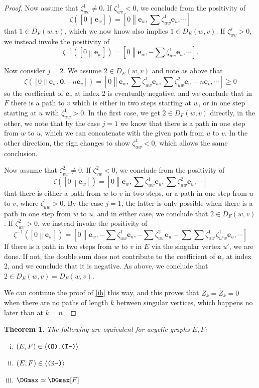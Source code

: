 \documentclass[12pt]{amsbook}%
\newcommand{\ee}{{\mathbf e}}
\newtheorem{theor}{Theorem}[section]
\theoremstyle{defin}
\theoremstyle{remark}
\numberwithin{equation}{chapter}
\numberwithin{theor}{section}
\newcommand{\IIIm}{\mbox{\texttt{\textup{(I-)}}}}
\newcommand{\OOO}{\mbox{\texttt{\textup{(O)}}}}
\newcommand{\KKKm}{\mbox{\texttt{\textup{(K-)}}}}
\newcommand{\oXe}[2]{\left[#1\left\|{#2}\right.\right]}
\newcommand{\singX}{{\circ}}
\newcommand{\oo}{{\mathbf 0}}
\newcommand{\nos}{{n_\singX}}
\begin{document}
\begin{proof}
Now assume that $\zeta^1_{wv}\not=0$. If $\zeta^1_{wv}<0$, we conclude from the positivity of
\[
\zeta( \oXe{0}{\ee_w})=\oXe{0}{\textstyle \ee_w,\sum\zeta^1_{uw}\ee_u,\cdots}
\]
that $1\in D_F(w,v)$, which we now know also implies  $1\in D_E(w,v)$. If $\zeta^j_{wv}>0$, we instead invoke the positivity of 
\[
\zeta^{-1}( \oXe{0}{\ee_w})=\oXe{0}{\ee_w,-\sum\zeta^1_{uw}\ee_u,\cdots}.
\]

Now consider $j=2$. We assume $2\in D_E(w,v)$ and note as above that 
\[
\zeta( \oXe{0}{\ee_w,\oo,-n\ee_v})=\oXe{0}{\textstyle \ee_w,\sum\zeta^1_{uw}\ee_u,\sum\zeta^2_{uw}\ee_u-n\ee_v,\cdots}\geq 0
\]
so the coefficient of $\ee_v$ at index 2 is eventually negative, and we conclude that in $F$ there is a path to $v$ which is either in two steps starting at $w$, or in one step starting at $u$ with $\zeta^1_{uw}>0$. In the first case, we get  $2\in D_F(w,v)$ directly, in the other, we note that by the case $j=1$ we know that there is a path in one step from $w$ to $u$, which we can concatenate with the given path from $u$ to $v$. In the other direction, the sign changes to show $\zeta^1_{uw}<0$, which allows the same conclusion.


Now assume that $\zeta^2_{vw}\not=0$. If $\zeta^2_{vw}<0$, we conclude from the positivity of
\[
\zeta( \oXe{0}{\ee_w})=\oXe{0}{\textstyle \ee_w,\sum\zeta^1_{uw}\ee_u,\sum\zeta^2_{uw}\ee_u,\cdots}
\]
that there is either a path from $w$ to $v$ in two steps, or a path in one step from $u$ to $v$, where $\zeta^1_{uw}>0$. By the case $j=1$, the latter is only possible when there is a path in one step from $w$ to $u$, and in either case, we conclude 
that $2\in D_F(w,v)$. If $\zeta^2_{wv}>0$, we instead invoke the positivity of 
\[
\zeta^{-1}( \oXe{0}{\ee_w})=\oXe{0}{\textstyle \ee_w,-\sum\zeta^1_{uw}\ee_u,-\sum\zeta^2_{uw}\ee_u-\sum\sum \zeta^1_{uu'}\zeta^1_{u'w}\ee_u,\cdots}
\]
If there is a path in two steps from $w$ to $v$ in $E$ via the singular vertex $u'$, we are done. If not, the double sum does not contribute to the coefficient of $\ee_v$ at index 2, and we conclude that it is negative. As above, we conclude that $2\in D_E(w,v)= D_F(w,v)$. 

We can continue the proof of \eqref{ih} this way, and this proves that $Z_k=\widetilde{Z}_k=0$ when there are no paths of length $k$ between singular vertices, which happens no later than at $k=\nos$.
\end{proof}


\begin{theor}
The following are equivalent for acyclic graphs $E,F$:
\begin{enumerate}[(i)]
\item $(E,F)\in\langle \OOO,\IIIm\rangle$
\item $(E,F)\in\langle \KKKm\rangle$
\item $\DGmax\simeq \DGmax[F]$
\end{enumerate}
\end{theor}
\end{document}

